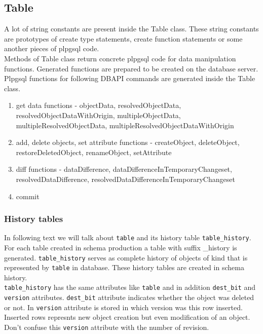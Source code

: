\documentclass[deska]{subfiles}
\begin{document}
\subsection{Table}
A lot of string constants are present inside the Table class. These string constants are prototypes of create type statements, create function statements or some another pieces of plpgsql code.\\
Methods of Table class return concrete plpgsql code for data manipulation functions. Generated functions are prepared to be created on the database server.\\
Plpgsql functions for following DBAPI commands are generated inside the Table class.

\begin{enumerate}
    \item get data functions - objectData, resolvedObjectData, resolvedObjectDataWithOrigin, multipleObjectData, multipleResolvedObjectData, multipleResolvedObjectDataWithOrigin
    \item add, delete objects, set attribute functions - createObject, deleteObject, restoreDeletedObject, renameObject, setAttribute
    \item diff functions - dataDifference, dataDifferenceInTemporaryChangeset, resolvedDataDifference, resolvedDataDifferenceInTemporaryChangeset
    \item commit
\end{enumerate}

\subsubsection{History tables}
In following text we will talk about {\tt table} and its history table {\tt table\_history}.\\
For each table created in schema production a table with suffix \_history is generated. {\tt table\_history} serves as complete history of objects of kind that is represented by {\tt table} in database. These history tables are created in schema history.\\
{\tt table\_history} has the same attributes like {\tt table} and in addition {\tt dest\_bit} and {\tt version} attributes. {\tt dest\_bit} attribute indicates whether the object was deleted or not. In {\tt version} attribute is stored in which version was this row inserted. Inserted rows represnts new object creation but even modification of an object. Don't confuse this {\tt version} attribute with the number of revision.
\end{document}
